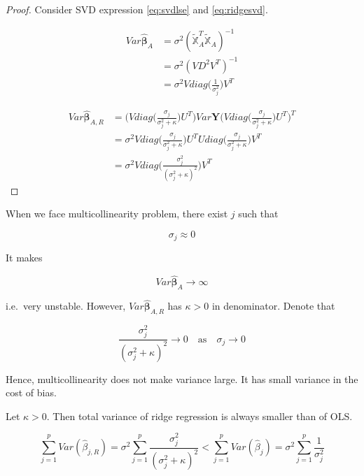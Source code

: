 \documentclass[]{book}
\theoremstyle{definition}
\theoremstyle{definition}
\theoremstyle{definition}
\theoremstyle{remark}
\let\BeginKnitrBlock\begin \let\EndKnitrBlock\end
\begin{document}
\BeginKnitrBlock{proof}
{}Consider SVD expression \eqref{eq:svdlse} and \eqref{eq:ridgesvd}.

\begin{equation*}
  \begin{split}
    Var\boldsymbol{\hat\beta}_A & = \sigma^2 (\widetilde{\mathbb{X}}_A^T \widetilde{\mathbb{X}}_A)^{-1} \\
    & = \sigma^2 (VD^2 V^T)^{-1} \\
    & = \sigma^2 V diag\bigg( \frac{1}{\sigma_j^2} \bigg) V^T
  \end{split}
\end{equation*}

\begin{equation*}
  \begin{split}
    Var\boldsymbol{\hat\beta}_{A, R} & = \bigg( V diag\Big( \frac{\sigma_j}{\sigma_j^2 + \kappa} \Big) U^T \bigg) Var \mathbf{Y} \bigg( V diag\Big( \frac{\sigma_j}{\sigma_j^2 + \kappa} \Big) U^T \bigg)^T \\
    & = \sigma^2 V diag\Big( \frac{\sigma_j}{\sigma_j^2 + \kappa} \Big) U^T U diag\Big( \frac{\sigma_j}{\sigma_j^2 + \kappa} \Big) V^T \\
    & = \sigma^2 V diag\Big( \frac{\sigma_j^2}{(\sigma_j^2 + \kappa)^2} \Big) V^T
  \end{split}
\end{equation*}
\EndKnitrBlock{proof}

When we face multicollinearity problem, there exist \(j\) such that

\[\sigma_j \approx 0\]

It makes

\[Var\boldsymbol{\hat\beta}_A \rightarrow \infty\]

i.e.~very unstable. However, \(Var\boldsymbol{\hat\beta}_{A, R}\) has \(\kappa > 0\) in denominator. Denote that

\[\frac{\sigma_j^2}{(\sigma_j^2 + \kappa)^2} \rightarrow 0 \quad \text{as} \quad \sigma_j \rightarrow 0\]

Hence, multicollinearity does not make variance large. It has small variance in the cost of bias.

\BeginKnitrBlock{theorem}[Total variance]
\protect\hypertarget{thm:ridgetot}{}{\label{thm:ridgetot} {} }Let \(\kappa > 0\). Then total variance of ridge regression is always smaller than of OLS.

\[\sum_{j = 1}^p Var(\hat\beta_{j, R}) = \sigma^2 \sum_{j = 1}^p \frac{\sigma_j^2}{(\sigma_j^2 + \kappa)^2} < \sum_{j = 1}^p Var(\hat\beta_j) = \sigma^2 \sum_{j = 1}^p \frac{1}{\sigma_j^2}\]
\EndKnitrBlock{theorem}
\end{document}
